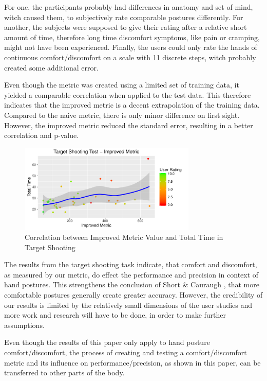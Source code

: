 \documentclass{sig-alternate-05-2015}
\begin{document}
For one, the participants probably had differences in anatomy and set of mind, witch caused them, to subjectively rate comparable postures differently. For another, the subjects were supposed to give their rating after a relative short amount of time, therefore long time discomfort symptoms, like pain or cramping, might not have been experienced. Finally, the users could only rate the hands of continuous comfort/discomfort on a scale with 11 discrete steps, witch probably created some additional error.

Even though the metric was created using a limited set of training data, it yielded a comparable correlation when applied to the test data. This therefore indicates that the improved metric is a decent extrapolation of the training data. Compared to the naive metric, there is only minor difference on first sight. However, the improved metric reduced the standard error, resulting in a better correlation and p-value.

\begin{figure}[h]
\centering
\includegraphics[width=8.45cm]{TargetShooting}
\vspace{-20pt}
\caption{Correlation between Improved Metric Value and Total Time in Target Shooting}
\label{fig:targetShooting}
\vspace{-10pt}
\end{figure}

The results from the target shooting task indicate, that comfort and discomfort, as measured by our metric, do effect the performance and precision in context of hand postures. This strengthens the conclusion of Short \& Cauraugh \cite{short1999precision}, that more comfortable postures generally create greater accuracy. However, the credibility of our results is limited by the relatively small dimensions of the user studies and more work and research will have to be done, in order to make further assumptions.

Even though the results of this paper only apply to hand posture comfort/discomfort, the process of creating and testing a comfort/discomfort metric and its influence on performance/precision, as shown in this paper, can be transferred to other parts of the body. 
\end{document}
